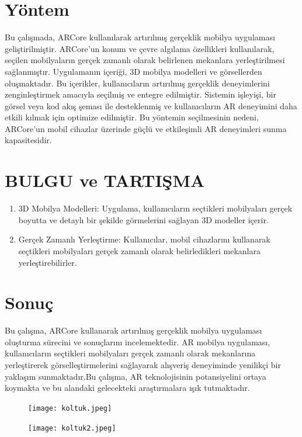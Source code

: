\documentclass[12pt, a4paper]{article}
\begin{document}
	\section{Yöntem}
	Bu çalışmada, ARCore kullanılarak artırılmış gerçeklik mobilya uygulaması geliştirilmiştir. ARCore’un konum ve çevre algılama özellikleri kullanılarak, seçilen mobilyaların gerçek zamanlı olarak belirlenen mekanlara yerleştirilmesi sağlanmıştır. Uygulamanın içeriği, 3D mobilya modelleri ve görsellerden oluşmaktadır. Bu içerikler, kullanıcıların artırılmış gerçeklik deneyimlerini zenginleştirmek amacıyla seçilmiş ve entegre edilmiştir. Sistemin işleyişi, bir görsel veya kod akış şeması ile desteklenmiş ve kullanıcıların AR deneyimini daha etkili kılmak için optimize edilmiştir. Bu yöntemin seçilmesinin nedeni, ARCore’un mobil cihazlar üzerinde güçlü ve etkileşimli AR deneyimleri sunma kapasitesidir.
	\section{ BULGU ve TARTIŞMA}
	\begin{enumerate}
		\item 3D Mobilya Modelleri: Uygulama, kullanıcıların seçtikleri mobilyaları gerçek boyutta ve detaylı bir şekilde görmelerini sağlayan 3D modeller içerir.
		\item  Gerçek Zamanlı Yerleştirme: Kullanıcılar, mobil cihazlarını kullanarak seçtikleri mobilyaları gerçek zamanlı olarak belirledikleri mekanlara yerleştirebilirler\cite{drive}.
		
	\end{enumerate}
	\section{Sonuç}
	Bu çalışma, ARCore kullanarak artırılmış gerçeklik mobilya uygulaması \newline oluşturma sürecini ve sonuçlarını incelemektedir. AR mobilya uygulaması, kullanıcıların seçtikleri mobilyaları gerçek zamanlı olarak mekanlarına \newline yerleştirerek görselleştirmelerini sağlayarak alışveriş deneyiminde yenilikçi bir yaklaşım sunmaktadır.Bu çalışma, AR teknolojisinin potansiyelini ortaya koymakta ve bu alandaki gelecekteki araştırmalara ışık tutmaktadır.
	\newpage
	\begin{figure}[!htb]
		
		\begin{minipage}{0.48\textwidth}
			\centering
			\texttt{[image: koltuk.jpeg]}
			\caption{}\label{Fig:Data1}
		\end{minipage}\hfill
		\begin{minipage}{0.48\textwidth}
			\centering
			\texttt{[image: koltuk2.jpeg]}
			\caption{}\label{Fig:Data2}
		\end{minipage}
	\end{figure}
\end{document}
